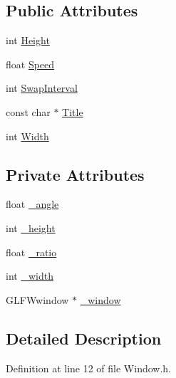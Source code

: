 \subsection*{Public Attributes}
\begin{DoxyCompactItemize}
\item 
int \mbox{\hyperlink{classEngine_1_1Components_1_1Window_ad9cf40200634bff27dbc7ae9a841bb99}{Height}}
\item 
float \mbox{\hyperlink{classEngine_1_1Components_1_1Window_a13e154573d91195ef0f545a9fa0e0403}{Speed}}
\item 
int \mbox{\hyperlink{classEngine_1_1Components_1_1Window_a99094c227614faf796be6db157cdf7e6}{Swap\+Interval}}
\item 
const char $\ast$ \mbox{\hyperlink{classEngine_1_1Components_1_1Window_adedeb611fa5cecb35f940cea40e5badd}{Title}}
\item 
int \mbox{\hyperlink{classEngine_1_1Components_1_1Window_ad5f71bfbb06ff5452b63bddf4b0c20b1}{Width}}
\end{DoxyCompactItemize}
\subsection*{Private Attributes}
\begin{DoxyCompactItemize}
\item 
float \mbox{\hyperlink{classEngine_1_1Components_1_1Window_a3402f1bd44e0ac341bb6749dbe2fa0b6}{\+\_\+angle}}
\item 
int \mbox{\hyperlink{classEngine_1_1Components_1_1Window_a0a50127d5427b543f83d88bb03a99c1e}{\+\_\+height}}
\item 
float \mbox{\hyperlink{classEngine_1_1Components_1_1Window_a785d2029ba6e6b10c7adab8513ec88b3}{\+\_\+ratio}}
\item 
int \mbox{\hyperlink{classEngine_1_1Components_1_1Window_a65e35d20618664aac50bc7036896b524}{\+\_\+width}}
\item 
G\+L\+F\+Wwindow $\ast$ \mbox{\hyperlink{classEngine_1_1Components_1_1Window_a4e37d9a51476443d15d9a395d278237a}{\+\_\+window}}
\end{DoxyCompactItemize}


\subsection{Detailed Description}


Definition at line 12 of file Window.\+h.




